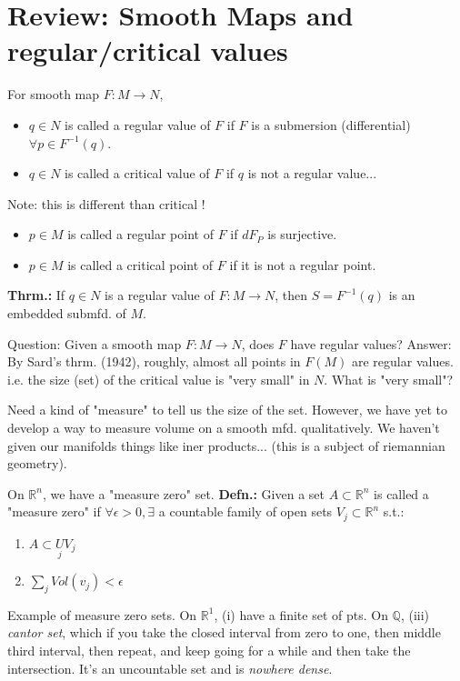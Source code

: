 \documentclass[12pt,letterpaper]{article}
\begin{document}
\section*{Review: Smooth Maps and regular/critical values}
For smooth map $F: M \rightarrow N$, 
\begin{itemize}
    \item $q \in N$ is called a regular value of $F$ if $F$ is a submersion (differential) $\forall p \in F^{-1}(q)$. 
    \item $q \in N$ is called a critical value of $F$ if $q$ is not a regular value...
\end{itemize}
Note: this is different than critical !
\begin{itemize}
    \item $p \in M$ is called a regular point of $F$ if $dF_P$ is surjective.
    \item $p \in M$ is called a critical point of $F$ if it is not a regular point.
\end{itemize}

\textbf{Thrm.:} If $q \in N$ is a regular value of $F: M \rightarrow N$, then $S=F^{-1}(q)$ is an embedded submfd. of $M$. 

Question: Given a smooth map $F: M\rightarrow N$, does $F$ have regular values? Answer: By Sard's thrm. (1942), roughly, almost all points in $F(M)$ are regular values. i.e. the size (set) of the critical value is "very small" in $N$. What is "very small"?

Need a kind of "measure" to tell us the size of the set. However, we have yet to develop a way to measure volume on a smooth mfd. qualitatively. We haven't given our manifolds things like iner products... (this is a subject of riemannian geometry). 

On $\mathbb{R}^n$, we have a "measure zero" set. \textbf{Defn.:} Given a set $A \subset \mathbb{R}^n$ is called a "measure zero" if $\forall \epsilon > 0, \exists $ a countable family of open sets $V_j \subset \mathbb{R}^n$ s.t.:
\begin{enumerate}
    \item $A \subset \underset{j}{U} V_j$
    \item $\sum_j Vol(v_j) < \epsilon $ 
\end{enumerate}

Example of measure zero sets. On $\mathbb{R}^1$, (i) have a finite set of pts. On $\mathbb{Q}$, (iii) \textit{cantor set}, which if you take the closed interval from zero to one, then middle third interval, then repeat, and keep going for a while and then take the intersection. It's an uncountable set and is \textit{nowhere dense}.
\end{document}
